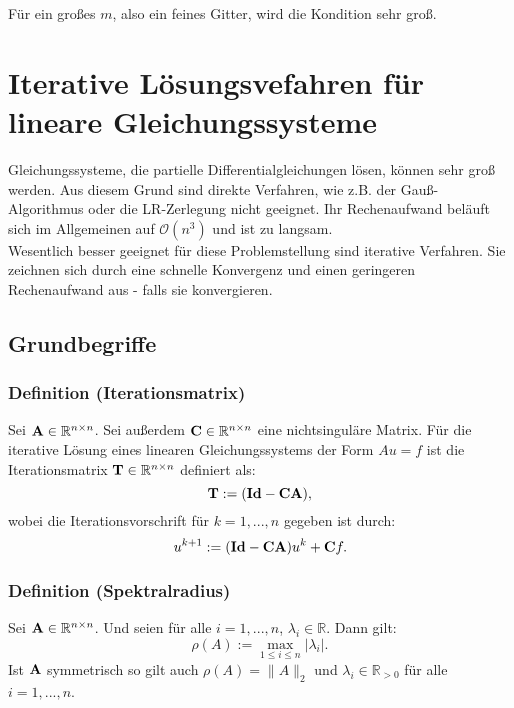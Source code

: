Für ein großes $m$, also ein feines Gitter, wird die Kondition sehr groß.

\chapter{Iterative Lösungsvefahren für lineare Gleichungssysteme}\label{c.IterativeVerfahren}

Gleichungssysteme, die partielle Differentialgleichungen lösen, können sehr groß werden. Aus diesem Grund sind direkte Verfahren, wie z.B. der Gauß-Algorithmus oder die LR-Zerlegung nicht geeignet. Ihr Rechenaufwand beläuft sich im Allgemeinen auf $\mathcal{O}(n^{3})$ und ist zu langsam.\\
Wesentlich besser geeignet für diese Problemstellung sind iterative Verfahren. Sie zeichnen sich durch eine schnelle Konvergenz und einen geringeren Rechenaufwand aus - falls sie konvergieren.

\section{Grundbegriffe}\label{s.Grundbegriffe}

\subsection{Definition (Iterationsmatrix)}\label{ss.Iterationsmatrix}

Sei ${\textbf{A}} \in \mathbb{R}^{n \times n}$. Sei außerdem ${\textbf{C}} \in \mathbb{R}^{n \times n}$ eine nichtsinguläre Matrix. Für die iterative Lösung eines linearen Gleichungssystems der Form $Au = f$ ist die Iterationsmatrix ${\textbf{T}} \in \mathbb{R}^{n \times n}$ definiert als:
\begin{equation}
{\textbf{T}} := ({\textbf{Id}} - {\textbf{C}} {\textbf{A}}),
\end{equation}
wobei die Iterationsvorschrift für $k=1,...,n$ gegeben ist durch:
\begin{equation}
u^{k+1} := ({\textbf{Id}} - {\textbf{C}} {\textbf{A}})u^{k} + {\textbf{C}} f.\label{eq.Iteratives Verfahren}
\end{equation}

\subsection{Definition (Spektralradius)}\label{s.Spektralradius}

Sei ${\textbf{A}} \in \mathbb{R}^{n \times n}$. Und seien für alle $i=1,...,n$, $\lambda_{i} \in \mathbb{R}$. Dann gilt:
\begin{equation}
\rho(A) := \max_{1 \le i \le n} | \lambda_{i} |.
\end{equation}
Ist ${\textbf{A}}$ symmetrisch so gilt auch $\rho(A) = \| A \|_{2}$ und $\lambda_{i} \in \mathbb{R}_{>0}$ für alle $i=1,...,n$.

